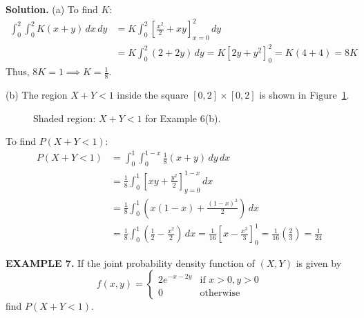 \documentclass{article}
\begin{document}
\textbf{Solution.} 
(a) To find $K$:
\begin{align*}
\int_{0}^{2} \int_{0}^{2} K(x+y) \,dx \,dy &= K \int_{0}^{2} \left[ \frac{x^2}{2} + xy \right]_{x=0}^{2} \,dy \\
&= K \int_{0}^{2} (2 + 2y) \,dy = K \left[ 2y + y^2 \right]_{0}^{2} = K(4+4) = 8K
\end{align*}
Thus, $8K = 1 \implies K = \frac{1}{8}$.

(b) The region $X+Y<1$ inside the square $[0,2]\times[0,2]$ is shown in Figure~\ref{fig:ex6b}.
\begin{figure}[H]
\centering
{}
\caption{Shaded region: $X+Y<1$ for Example 6(b).}
\label{fig:ex6b}
\end{figure}
To find $P(X+Y < 1)$:
\begin{align*}
P(X+Y < 1) &= \int_{0}^{1} \int_{0}^{1-x} \frac{1}{8}(x+y) \,dy \,dx \\
&= \frac{1}{8} \int_{0}^{1} \left[ xy + \frac{y^2}{2} \right]_{y=0}^{1-x} \,dx \\
&= \frac{1}{8} \int_{0}^{1} \left( x(1-x) + \frac{(1-x)^2}{2} \right) \,dx \\
&= \frac{1}{8} \int_{0}^{1} \left( \frac{1}{2} - \frac{x^2}{2} \right) \,dx = \frac{1}{16} \left[ x - \frac{x^3}{3} \right]_{0}^{1} = \frac{1}{16} \left( \frac{2}{3} \right) = \frac{1}{24}
\end{align*}

\vspace{1em}

\textbf{EXAMPLE 7.} If the joint probability density function of $(X,Y)$ is given by
$$
f(x, y) = \begin{cases} 2e^{-x-2y} & \text{if } x > 0, y > 0 \\ 0 & \text{otherwise} \end{cases}
$$
find $P(X +Y < 1)$.
\end{document}

